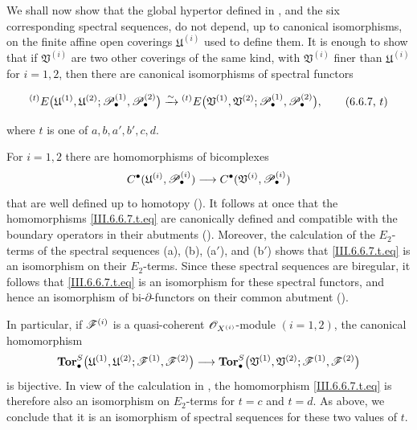 \begin{env}[6.6.7]
\label{III.6.6.7}
We shall now show that the global hypertor defined in
, and the six corresponding spectral sequences,
do not depend, up to canonical isomorphisms, on the finite affine
open coverings $\mathfrak U^{(i)}$ used to define them.  It is
enough to show that if $\mathfrak V^{(i)}$ are two other
coverings of the same kind, with $\mathfrak V^{(i)}$ finer than
$\mathfrak U^{(i)}$ for $i=1,2$, then there are canonical
isomorphisms of spectral functors
\begin{env}[6.6.7, $t$]
\label{III.6.6.7.t}
\[
  {}^{(t)}E
  \bigl(
    \mathfrak U^{(1)},\mathfrak U^{(2)};
    \sh P_\bullet^{(1)},\sh P_\bullet^{(2)}
  \bigr)
  \xrightarrow{\sim}
  {}^{(t)}E
  \bigl(
    \mathfrak V^{(1)},\mathfrak V^{(2)};
    \sh P_\bullet^{(1)},\sh P_\bullet^{(2)}
  \bigr),
  \tag{6.6.7, $t$}\label{III.6.6.7.t.eq}
\]
\end{env}
where $t$ is one of $a,b,a',b',c,d$.

For $i=1,2$ there are homomorphisms of bicomplexes
\[
  C^\bullet
  (\mathfrak U^{(i)},\mathscr{P}_\bullet^{(i)})
  \longrightarrow
  C^\bullet
  (\mathfrak V^{(i)},\mathscr{P}_\bullet^{(i)})
\]
that are well defined up to homotopy
().  It follows at once that the
homomorphisms \eqref{III.6.6.7.t.eq} are canonically defined and
compatible with the boundary operators in their abutments
().  Moreover, the calculation of the
$E_2$-terms of the spectral sequences
\textnormal{(a)}, \textnormal{(b)}, \textnormal{(a$'$)}, and
\textnormal{(b$'$)} shows that
\eqref{III.6.6.7.t.eq} is an isomorphism on their $E_2$-terms.
Since these spectral sequences are biregular, it follows that
\eqref{III.6.6.7.t.eq} is an isomorphism for these spectral
functors, and hence an isomorphism of bi-$\partial$-functors on
their common abutment ().

In particular, if $\mathscr{F}^{(i)}$ is a quasi-coherent
$\mathscr{O}_{X^{(i)}}$-module $(i=1,2)$, the canonical homomorphism
\[
  \mathbf{Tor}_\bullet^S
  \bigl(
    \mathfrak U^{(1)},\mathfrak U^{(2)};
    \mathscr{F}^{(1)},\mathscr{F}^{(2)}
  \bigr)
  \longrightarrow
  \mathbf{Tor}_\bullet^S
  \bigl(
    \mathfrak V^{(1)},\mathfrak V^{(2)};
    \mathscr{F}^{(1)},\mathscr{F}^{(2)}
  \bigr)
\]
is bijective.  In view of the calculation in
, the homomorphism
\eqref{III.6.6.7.t.eq} is therefore also an isomorphism on
$E_2$-terms for $t=c$ and $t=d$.  As above, we conclude that it
is an isomorphism of spectral sequences for these two values of
$t$.


\end{env}
